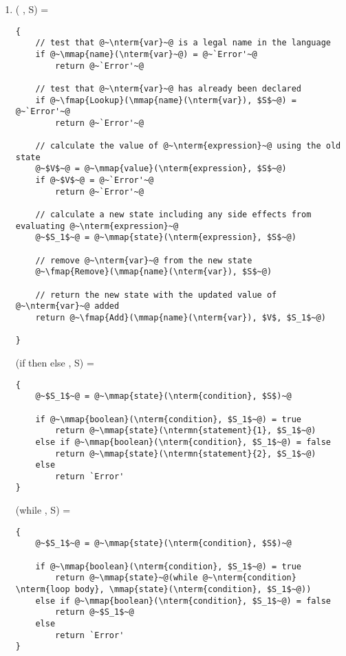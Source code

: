 \documentclass{article}
\begin{document}
\begin{enumerate}
\item {}( \peq {}, S) = \begin{lstlisting}
{
    // test that @~\nterm{var}~@ is a legal name in the language
    if @~\mmap{name}(\nterm{var}~@) = @~`Error'~@
        return @~`Error'~@
   
    // test that @~\nterm{var}~@ has already been declared
    if @~\fmap{Lookup}(\mmap{name}(\nterm{var}), $S$~@) = @~`Error'~@
        return @~`Error'~@

    // calculate the value of @~\nterm{expression}~@ using the old state
    @~$V$~@ = @~\mmap{value}(\nterm{expression}, $S$~@)
    if @~$V$~@ = @~`Error'~@
        return @~`Error'~@
   
    // calculate a new state including any side effects from evaluating @~\nterm{expression}~@
    @~$S_1$~@ = @~\mmap{state}(\nterm{expression}, $S$~@)

    // remove @~\nterm{var}~@ from the new state
    @~\fmap{Remove}(\mmap{name}(\nterm{var}), $S$~@)

    // return the new state with the updated value of @~\nterm{var}~@ added
    return @~\fmap{Add}(\mmap{name}(\nterm{var}), $V$, $S_1$~@)
             
}
\end{lstlisting}


(if  then  else , S) = \begin{lstlisting}
{
    @~$S_1$~@ = @~\mmap{state}(\nterm{condition}, $S$)~@
    
    if @~\mmap{boolean}(\nterm{condition}, $S_1$~@) = true
        return @~\mmap{state}(\ntermn{statement}{1}, $S_1$~@)
    else if @~\mmap{boolean}(\nterm{condition}, $S_1$~@) = false 
        return @~\mmap{state}(\ntermn{statement}{2}, $S_1$~@)
    else
        return `Error'
}
\end{lstlisting}


(while  , S) = \begin{lstlisting}
{
    @~$S_1$~@ = @~\mmap{state}(\nterm{condition}, $S$)~@
    
    if @~\mmap{boolean}(\nterm{condition}, $S_1$~@) = true
        return @~\mmap{state}~@(while @~\nterm{condition} \nterm{loop body}, \mmap{state}(\nterm{condition}, $S_1$~@))
    else if @~\mmap{boolean}(\nterm{condition}, $S_1$~@) = false 
        return @~$S_1$~@ 
    else
        return `Error'
}
\end{lstlisting}
\end{enumerate}
\end{document}
